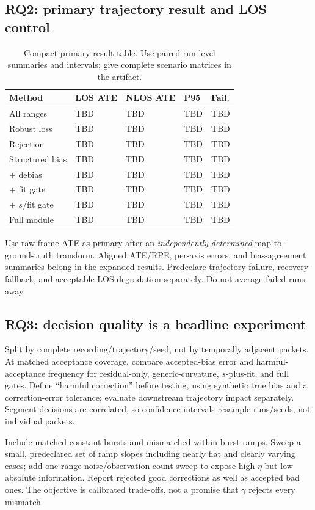 \documentclass[conference]{IEEEtran}%
\begin{document}
\subsection{RQ2: primary trajectory result and LOS control}
\begin{table}[t]
\centering\small
\caption{Compact primary result table. Use paired run-level summaries and intervals; give complete scenario matrices in the artifact.}
\label{tab:main}
\begin{tabularx}{\columnwidth}{@{}lXXXX@{}}
\toprule
Method & LOS ATE & NLOS ATE & P95 & Fail.\\
\midrule
All ranges & TBD & TBD & TBD & TBD\\
Robust loss & TBD & TBD & TBD & TBD\\
Rejection & TBD & TBD & TBD & TBD\\
Structured bias & TBD & TBD & TBD & TBD\\
+ debias & TBD & TBD & TBD & TBD\\
+ fit gate & TBD & TBD & TBD & TBD\\
+ $s$/fit gate & TBD & TBD & TBD & TBD\\
Full module & TBD & TBD & TBD & TBD\\
\bottomrule
\end{tabularx}
\end{table}
Use raw-frame ATE as primary after an \emph{independently determined} map-to-ground-truth transform. Aligned ATE/RPE, per-axis errors, and bias-agreement summaries belong in the expanded results. Predeclare trajectory failure, recovery fallback, and acceptable LOS degradation separately. Do not average failed runs away.

\subsection{RQ3: decision quality is a headline experiment}
\label{sec:rq3}
Split by complete recording/trajectory/seed, not by temporally adjacent packets. At matched acceptance coverage, compare accepted-bias error and harmful-acceptance frequency for residual-only, generic-curvature, $s$-plus-fit, and full gates. Define ``harmful correction'' before testing, using synthetic true bias and a correction-error tolerance; evaluate downstream trajectory impact separately. Segment decisions are correlated, so confidence intervals resample runs/seeds, not individual packets.

Include matched constant bursts and mismatched within-burst ramps. Sweep a small, predeclared set of ramp slopes including nearly flat and clearly varying cases; add one range-noise/observation-count sweep to expose high-$\eta$ but low absolute information. Report rejected good corrections as well as accepted bad ones. The objective is calibrated trade-offs, not a promise that $\gamma$ rejects every mismatch.
\end{document}
